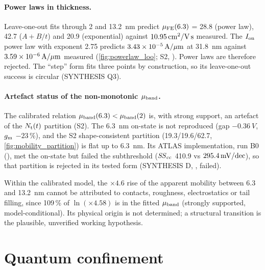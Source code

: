 \paragraph{Power laws in thickness.} Leave-one-out fits through 2 and \SI{13.2}{nm} predict $\mu_{\mathrm{FE}}(6.3)$ = 28.8 (power law), 42.7 ($A + B/t$) and 20.9 (exponential) against $10.95\,\mathrm{cm}^{2}/\mathrm{V\,s}$ measured. The $I_{\mathrm{on}}$ power law with exponent 2.75 predicts $3.43\times10^{-5}\,\mathrm{A}/\mu\mathrm{m}$ at \SI{31.8}{nm} against $3.59\times10^{-6}\,\mathrm{A}/\mu\mathrm{m}$ measured (\cref{fig:powerlaw_loo}; S2, \evDATA). Power laws are therefore rejected. The ``step'' form fits three points by construction, so its leave-one-out success is circular (SYNTHESIS Q3).

\paragraph{Artefact status of the non-monotonic $\mu_{\mathrm{band}}$.} The calibrated relation $\mu_{\mathrm{band}}(6.3) < \mu_{\mathrm{band}}(2)$ is, with strong support, an artefact of the $N_{\mathrm{t}}(t)$ partition (S2). The \SI{6.3}{nm} on-state is not reproduced (gap $-\SI{0.36}{V}$, $g_{\mathrm{m}}$ $-23$\,\%), and the S2 shape-consistent partition (19.3/19.6/62.7, \cref{fig:mobility_partition}) is flat up to \SI{6.3}{nm}. Its ATLAS implementation, run B0 (), met the on-state but failed the subthreshold ($\mathit{SS}_{\mathrm{cc}}$ 410.9 vs $295.4\,\mathrm{mV/dec}$), so that partition is rejected in its tested form (SYNTHESIS D, \evOOS, failed).

\begin{keyresult}[title={Transport: verdict}]
Within the calibrated model, the $\times 4.6$ rise of the apparent mobility between 6.3 and \SI{13.2}{nm} cannot be attributed to contacts, roughness, electrostatics or tail filling, since 109\,\% of $\ln(\times 4.58)$ is in the fitted $\mu_{\mathrm{band}}$ (strongly supported, model-conditional). Its physical origin is not determined; a structural transition is the plausible, unverified working hypothesis.
\end{keyresult}

\section{Quantum confinement}\label{sec:mech-confinement}

